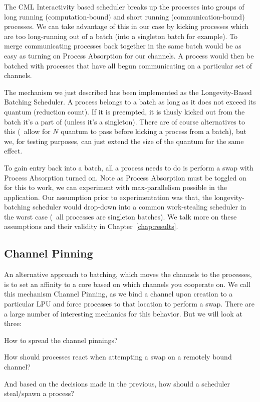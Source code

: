 The CML Interactivity based scheduler breaks up the processes into groups of
long running (computation-bound) and short running (communication-bound)
processes. We can take advantage of this in our case by kicking processes which
are too long-running out of a batch (into a singleton batch for example). To 
merge communicating processes back together in the same batch would be as easy
as turning on Process Absorption for our channels. A process would then be
batched with processes that have all begun communicating on a particular set
of channels.

The mechanism we just described has been implemented as the Longevity-Based
Batching Scheduler. A process belongs to a batch as long as it does not exceed
its quantum (reduction count). If it is preempted, it is thusly kicked out 
from the batch it's a part of (unless it's a singleton). There are of course
alternatives to this (\eg~allow for $N$ quantum to pass before kicking a 
process from a batch), but we, for testing purposes, can just extend the size
of the quantum for the same effect.

To gain entry back into a batch, all a process needs to do is perform a swap 
with Process Absorption turned on. Note as Process Absorption must be toggled
on for this to work, we can experiment with max-parallelism possible in the 
application. Our assumption prior to experimentation was that, the 
longevity-batching scheduler would drop-down into a common work-stealing
scheduler in the worst case (\ie~all processes are singleton batches). We talk 
more on these assumptions and their validity in Chapter~\ref{chap:results}.


\subsection{Channel Pinning}\label{sec:channel pinning}

An alternative approach to batching, which moves the channels to the processes,
is to set an affinity to a core based on which channels you cooperate on. We 
call this mechanism Channel Pinning, as we bind a channel upon creation to a
particular LPU and force processes to that location to perform a swap. 
There are a large number of interesting mechanics for this behavior. But we 
will look at three: 
\begin{inparaenum}
\item How to spread the channel pinnings?
\item How should processes react when attempting a swap on a remotely bound channel?
\item And based on the decisions made in the previous, how should a scheduler steal/spawn a process?
\end{inparaenum}


